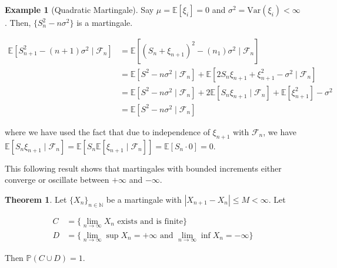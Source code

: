 \documentclass{article}
\theoremstyle{definition}
\newtheorem{theorem}{Theorem}[section]
\newtheorem{example}{Example}[section]
\theoremstyle{remark}
\theoremstyle{definition}
\begin{document}
  \begin{example}[Quadratic Martingale]
  Say $\mu = \mathbb{E}[\xi_i] = 0$ and $\sigma^2 = \mathrm{Var}(\xi_i) < \infty$. Then, $\{S_n^2 - n \sigma^2\}$ is a martingale. 

  \begin{align*}
    \mathbb{E}[S_{n+1}^2 - (n + 1) \sigma^2 \mid \mathcal{F}_n] & = \mathbb{E}[ (S_n + \xi_{n+1})^2 - (n _ 1) \sigma^2 \mid \mathcal{F}_n] \\
    & = \mathbb{E}[S^2 - n \sigma^2 \mid \mathcal{F}_n ] + \mathbb{E}[ 2 S_n \xi_{n+1} + \xi_{n+1}^2 - \sigma^2 \mid \mathcal{F}_n] \\
    & = \mathbb{E}[S^2 - n \sigma^2 \mid \mathcal{F}_n ] + 2 \mathbb{E}[ S_n \xi_{n+1} \mid \mathcal{F}_n ] + \mathbb{E}[\xi_{n+1}^2] - \sigma^2  \\
    & = \mathbb{E}[S^2 - n \sigma^2 \mid \mathcal{F}_n ]
  \end{align*}

  where we have used the fact that due to independence of $\xi_{n+1}$ with $\mathcal{F}_n$, we have $\mathbb{E}[S_n \xi_{n+1} \mid \mathcal{F}_n] = \mathbb{E}[S_n \mathbb{E}[ \xi_{n+1} \mid \mathcal{F}_n]] = \mathbb{E}[S_n \cdot 0] = 0$. 
  \end{example}

  This following result shows that martingales with bounded increments either converge or oscillate between $+\infty$ and $-\infty$. 

  \begin{theorem}
    Let $\{X_n\}_{n \in \mathbb{N}}$ be a martingale with $|X_{n+1} - X_n| \leq M < \infty$. Let 

    \begin{align*}
      C & = \{\lim_{n \rightarrow \infty} X_n \text{ exists and is finite}\} \\
      D & = \{\lim_{n \rightarrow \infty} \sup X_n = +\infty \text{ and } \lim_{n \rightarrow \infty} \inf X_n = -\infty\}
    \end{align*}

    Then $\mathbb{P}(C \cup D) = 1$. 
  \end{theorem}
\end{document}
